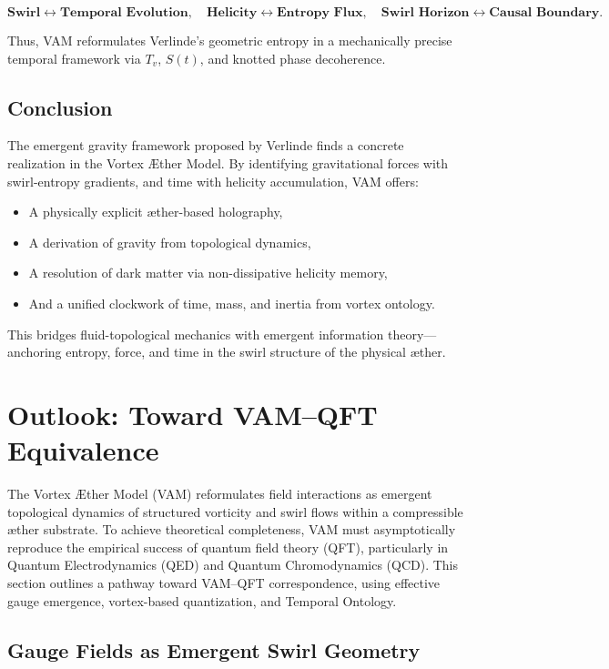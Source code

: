 \documentclass[12pt]{article}
\begin{document}
\[
\textbf{Swirl} \leftrightarrow \textbf{Temporal Evolution}, \quad
\textbf{Helicity} \leftrightarrow \textbf{Entropy Flux}, \quad
\textbf{Swirl Horizon} \leftrightarrow \textbf{Causal Boundary}.
\]

Thus, VAM reformulates Verlinde's geometric entropy in a mechanically precise temporal framework via \( T_v \), \( S(t) \), and knotted phase decoherence.

\subsection*{Conclusion}

The emergent gravity framework proposed by Verlinde finds a concrete realization in the Vortex \AE{}ther Model. By identifying gravitational forces with swirl-entropy gradients, and time with helicity accumulation, VAM offers:

\begin{itemize}
    \item A physically explicit æther-based holography,
    \item A derivation of gravity from topological dynamics,
    \item A resolution of dark matter via non-dissipative helicity memory,
    \item And a unified clockwork of time, mass, and inertia from vortex ontology.
\end{itemize}

This bridges fluid-topological mechanics with emergent information theory—anchoring entropy, force, and time in the swirl structure of the physical æther.

\section{Outlook: Toward VAM--QFT Equivalence}
\label{sec:vam_qft_outlook}

The Vortex \AE{}ther Model (VAM) reformulates field interactions as emergent topological dynamics of structured vorticity and swirl flows within a compressible æther substrate. To achieve theoretical completeness, VAM must asymptotically reproduce the empirical success of quantum field theory (QFT), particularly in Quantum Electrodynamics (QED) and Quantum Chromodynamics (QCD). This section outlines a pathway toward VAM--QFT correspondence, using effective gauge emergence, vortex-based quantization, and Temporal Ontology.

\subsection{Gauge Fields as Emergent Swirl Geometry}
\end{document}
